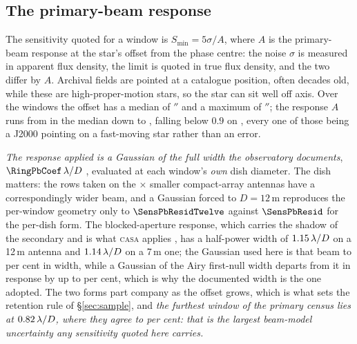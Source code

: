 \subsection{The primary-beam response}
\label{app:pbresp}

The sensitivity quoted for a window is $S_{\min}=5\sigma/A$, where $A$ is the
primary-beam response at the star's offset from the phase centre: the noise
$\sigma$ is measured in apparent flux density, the limit is quoted in true
flux density, and the two differ by $A$. Archival fields are
pointed at a catalogue position, often decades old, while these are
high-proper-motion stars, so the star can sit well off axis. Over the
\PbNWin{} windows the offset has a median of \PbOffMed$''$ and a
maximum of \BmOffMax$''$; the response $A$
runs from \BmRespMed{} in the median down to \BmRespMin, falling
below $0.9$ on \BmNBelowNine, every one of
those being a J2000 pointing on a fast-moving star rather than an error.

\emph{The response applied is a Gaussian of the full width the observatory
documents}, $\RingPbCoef\,\lambda/D$ \citep{ALMAHandbook}, evaluated at each
window's \emph{own} dish diameter. The dish matters: the \PbNAcaRow{} rows
taken on the \PbAcaRatio$\times$ smaller compact-array antennas have a
correspondingly wider beam, and a Gaussian forced to $D=12$\,m reproduces the
per-window geometry only to $\SensPbResidTwelve$ against $\SensPbResid$ for
the per-dish form. The blocked-aperture response, which carries the shadow of
the secondary and is what \textsc{casa} applies \citep{CASA2022}, has a
half-power width of $1.15\,\lambda/D$ on a 12\,m antenna and
$1.14\,\lambda/D$ on a 7\,m one; the Gaussian used here is that
beam to \BmDocAiryPct{} per cent in width, while a Gaussian of the Airy
first-null width departs from it in response by up to \BmModelMaxNullPct{} per
cent, which is why the documented width is the one adopted. The two forms part company as the
offset grows, which is what sets the retention rule of
\S\ref{sec:sample}, and \emph{the furthest
window of the primary census lies at $0.82\,\lambda/D$, where they
agree to \BmCensusWorstPct{} per cent: that is the largest beam-model
uncertainty any sensitivity quoted here carries.}


